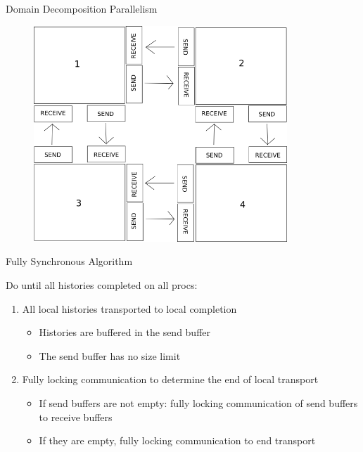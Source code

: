 \documentclass{beamer}
\begin{document}
\begin{frame}{Domain Decomposition Parallelism}

  \begin{figure}[h!]
    \begin{center}
      \includegraphics[width=3.75in]{domain_comm.png}
    \end{center}
  \end{figure}

\end{frame}

\begin{frame}{Fully Synchronous Algorithm}

  Do until all histories completed on all procs:

  \begin{enumerate}
  \item All local histories transported to local completion
    \begin{itemize}
    \item Histories are buffered in the send buffer
    \item The send buffer has no size limit
    \end{itemize}
  \item Fully locking communication to determine the end of local
    transport
    \medskip
    \begin{itemize}
    \item If send buffers are not empty: fully locking communication
      of send buffers to receive buffers
    \item If they are empty, fully locking communication to end transport
    \end{itemize}
  \end{enumerate}

\end{frame}
\end{document}
